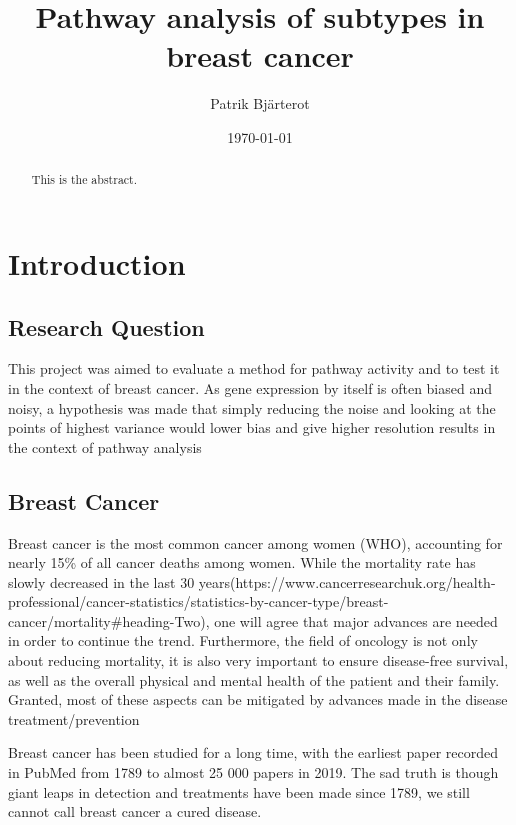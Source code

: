 \documentclass{kththesis}
\title{Pathway analysis of subtypes in breast cancer}
\author{Patrik Bjärterot}
\date{\today}
\begin{document}
\frontmatter

\titlepage

\begin{abstract}
  This is the abstract.

\end{abstract}

\tableofcontents


\mainmatter


\chapter{Introduction}

    \section{Research Question}
    This project was aimed to evaluate a method for pathway activity and to test it in the context of breast cancer. As gene expression by itself is often biased and noisy, a hypothesis was made that simply reducing the noise and looking at the points of highest variance would lower bias and give higher resolution results in the context of pathway analysis


    \section{Breast Cancer}
    Breast cancer is the most common cancer among women (WHO), accounting for nearly 15\% of all cancer deaths among women. While the mortality rate has slowly decreased in the last 30 years(https://www.cancerresearchuk.org/health-professional/cancer-statistics/statistics-by-cancer-type/breast-cancer/mortality#heading-Two), one will agree that major advances are needed in order to continue the trend. Furthermore, the field of oncology is not only about reducing mortality, it is also very important to ensure disease-free survival, as well as the overall physical and mental health of the patient and their family. Granted, most of these aspects can be mitigated by advances made in the disease treatment/prevention

    Breast cancer has been studied for a long time, with the earliest paper recorded in PubMed from 1789 to almost 25 000 papers in 2019. The sad truth is though giant leaps in detection and treatments have been made since 1789, we still cannot call breast cancer a cured disease.
\end{document}
